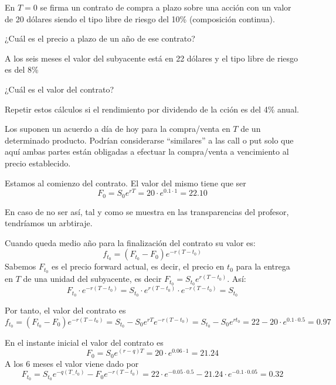 \begin{problem}[1]
En $T=0$ se firma un contrato de compra a plazo sobre una acción con un valor de 20 dólares siendo el tipo libre de riesgo del 10\% (composición continua).

\ppart ¿Cuál es el precio a plazo de un año de ese contrato?

A los seis meses el valor del subyacente está en 22 dólares y el tipo libre de riesgo es del 8\%

\ppart ¿Cuál es el valor del contrato?

\ppart Repetir estos cálculos si el rendimiento por dividendo de la cción es del 4\% anual.

\solution
{}

Los  suponen un acuerdo a día de hoy para la compra/venta en $T$ de un determinado producto. Podrían considerarse ``similares'' a las call o put solo que aquí ambas partes están obligadas a efectuar la compra/venta a vencimiento al precio establecido.

\spart
Estamos al comienzo del contrato. El valor del mismo tiene que ser
\[F_0 = S_0e^{rT} = 20 \cdot e^{0.1\cdot 1} = 22.10\]

En caso de no ser así, tal y como se muestra en las transparencias del profesor, tendríamos un arbtiraje.

\spart Cuando queda medio año para la finalización del contrato su valor es:
\[f_{t_0} = (F_{t_0}-F_0)e^{-r(T-t_0)}\]
Sabemos $F_{t_0}$ es el precio forward actual, es decir, el precio en $t_0$ para la entrega en $T$ de una unidad del subyacente, es decir $F_{t_0} = S_{t_0}e^{r(T-t_0)}$. Así:
\[F_{t_0} \cdot e^{-r(T-t_0)} = S_{t_0}\cdot e^{r(T-t_0)}  \cdot e^{-r(T-t_0)} =S_{t_0}\]

Por tanto, el valor del contrato es
\[f_{t_0} = (F_{t_0}-F_0)e^{-r(T-t_0)} = S_{t_0}-S_0e^{rT}e^{-r(T-t_0)} = S_{t_0}-S_0e^{rt_0} = 22 - 20\cdot e^{0.1\cdot 0.5} = 0.97 \]

\spart
En el instante inicial el valor del contrato es
\[F_0 = S_0e^{(r-q)T} = 20 \cdot e^{0.06\cdot 1} = 21.24\]
A los 6 meses el valor viene dado por
\[F_{t_0} = S_{t_0}e^{-q(T_-t_0)}-F_0e^{-r(T-t_0)} = 22\cdot e^{-0.05\cdot 0.5} - 21.24\cdot e^{-0.1\cdot 0.05} = 0.32\]

\end{problem}